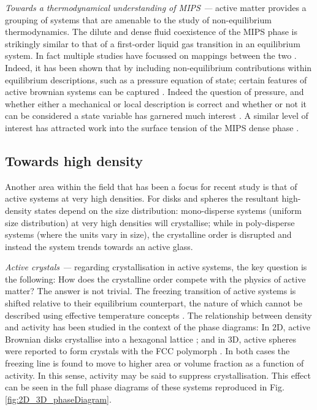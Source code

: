 \textit{Towards a thermodynamical understanding of MIPS ---} active matter provides a grouping of systems that are amenable to the study of non-equilibrium thermodynamics. The dilute and dense fluid coexistence of the  MIPS phase is strikingly similar to that of a first-order liquid gas transition in an equilibrium system. In fact multiple studies have focussed on mappings between the two \cite{tailleur2008,speck2014,cates2013,takatori2015}. 
Indeed, it has been shown that by including non-equilibrium contributions within equilibrium descriptions, such as a pressure equation of state; certain features of active brownian systems can be captured \cite{winkler2015,fodor2016a,levis2017}.
Indeed the question of pressure, and whether either a mechanical or local description is correct and whether or not it can be considered a state variable has garnered much interest \cite{speck2016,winkler2015,das2019,solon2015a,malgaretti2021,solon2015b}.  
A similar level of interest has attracted work into the surface tension of the MIPS dense phase \cite{solon2018,patch2018,lee2017}.


\subsection{Towards high density}

Another area within the field that has been a focus for recent study is that of active systems at very high densities. For disks and spheres the resultant high-density states depend on the size distribution: mono-disperse systems (uniform size distribution) at very high densities will crystallise; while in poly-disperse systems (where the units vary in size), the crystalline order is disrupted and instead the system trends towards an active glass.


\textit{Active crystals ---} regarding crystallisation in active systems, the key question is the following: How does the crystalline order compete with the physics of active matter?
The answer is not trivial. The freezing transition of active systems is shifted relative to their equilibrium counterpart, the nature of which cannot be described using effective temperature concepts \cite{loi2008,wang2011}.
The relationship between density and activity has been studied in the context of the phase diagrams: In 2D, active Brownian disks crystallise into a hexagonal lattice \cite{bialke2012,digregorio2018}; and in 3D, active spheres were reported to form crystals with the FCC polymorph \cite{turci2021,omar2021a}. In both cases the freezing line is found to move to higher area or volume fraction as a function of activity. In this sense, activity may be said to suppress crystallisation. This effect can be seen in the full phase diagrams of these systems reproduced in Fig. \ref{fig:2D_3D_phaseDiagram}. 

